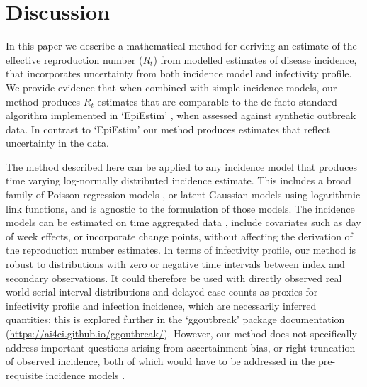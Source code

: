 \documentclass[10pt,letterpaper]{article}
\begin{document}
\section*{Discussion}

In this paper we describe a mathematical method for deriving an estimate of the effective reproduction number ($R_t$) from modelled estimates of disease incidence, that incorporates uncertainty from both incidence model and infectivity profile. We provide evidence that when combined with simple incidence models, our method produces $R_t$ estimates that are comparable to the de-facto standard algorithm implemented in `EpiEstim' \cite{thompson2019}, when assessed against synthetic outbreak data. In contrast to `EpiEstim' our method produces estimates that reflect uncertainty in the data.

The method described here can be applied to any incidence model that produces time varying log-normally distributed incidence estimate. This includes a broad family of Poisson regression models \cite{nelder1972,loader1999,hastie2017}, or latent Gaussian models \cite{rue2009} using logarithmic link functions, and is agnostic to the formulation of those models. The incidence models can be estimated on time aggregated data \cite{nash2023}, include covariates such as day of week effects, or incorporate change points, without affecting the derivation of the reproduction number estimates. In terms of infectivity profile, our method is robust to distributions with zero or negative time intervals between index and secondary observations. It could therefore be used with directly observed real world serial interval distributions \cite{park2021} and delayed case counts as proxies for infectivity profile and infection incidence, which are necessarily inferred quantities; this is explored further in the `ggoutbreak' package documentation (\url{https://ai4ci.github.io/ggoutbreak/}). However, our method does not specifically address important questions arising from ascertainment bias, or right truncation of observed incidence, both of which would have to be addressed in the pre-requisite incidence models \cite{abbott2020,abbott2024}.
\end{document}
